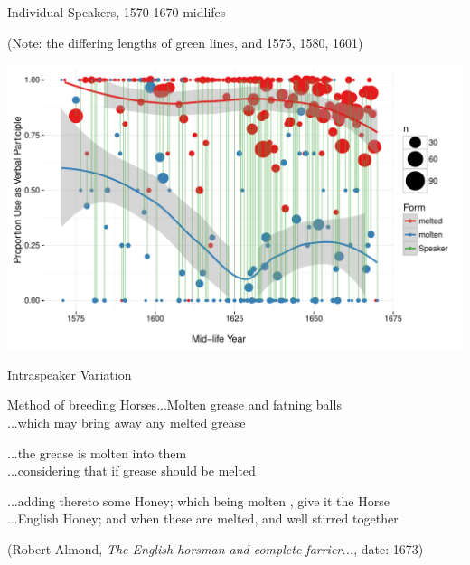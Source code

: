 \documentclass[hyperref={pdfpagelabels=false}]{beamer}
\begin{document}
\begin{frame}{Individual Speakers, 1570-1670 midlifes}

\begin{center}
\small{(Note: the differing lengths of green lines, and 1575, 1580, 1601)}

\includegraphics[width=1.128\textwidth]{ContextByDateAuthor1570.pdf}
\end{center}
\end{frame}

\begin{frame}{Intraspeaker Variation}
		\begin{exe}
			\ex \begin{xlist} \ex Method of breeding Horses...Molten grease and fatning balls\\
			\ex ...which may bring away any melted grease\\
			\end{xlist}
			\ex \begin{xlist} \ex ...the grease is molten into them\\
			\ex ...considering that if grease should be melted\\
			\end{xlist}
			\ex \begin{xlist} \ex...adding thereto some Honey; which being molten , give it the Horse\\
			\ex ...English Honey; and when these are melted, and well stirred together\\
			\end{xlist}
		\end{exe}
		(Robert Almond, \textsl{The English horsman and complete farrier...}, date: 1673)
\end{frame}
\end{document}
